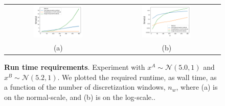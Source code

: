 \documentclass[a4paper]{article}
\begin{document}
\begin{figure}[H]
  \centering
  \begin{tabular}{cc}
  \includegraphics[width=0.48\textwidth]{figures/SNSruntimeSingleThread5_2.png}\label{fig:noarmal04} &  \includegraphics[width=0.48\textwidth]{figures/SNSruntimeLogSingleThread5_2.png}\label{fig:normal12} \\
  (a) & (b)
  \end{tabular}
  \caption{{\bf Run time requirements}. Experiment with $x^{A} \sim \mathcal{N}(5.0,1)$ and $x^{B} \sim \mathcal{N}(5.2,1)$. We plotted the required runtime, as wall time, as a function of the number of discretization windows, $n_w$, where (a) is on the normal-scale, and (b) is on the log-scale..\label{fig:runtime1}}
\end{figure}
\end{document}
